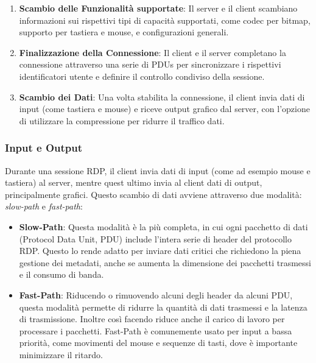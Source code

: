 \documentclass[12pt,a4paper,openright,twoside]{book}
\begin{document}
\begin{enumerate}
    \item \textbf{Scambio delle Funzionalità supportate}: Il server e il client scambiano informazioni sui rispettivi tipi di capacità supportati, come codec per bitmap, supporto per tastiera e mouse, e configurazioni generali.
    \item \textbf{Finalizzazione della Connessione}: Il client e il server completano la connessione attraverso una serie di PDUs per sincronizzare i rispettivi identificatori utente e definire il controllo condiviso della sessione.
    \item \textbf{Scambio dei Dati}: Una volta stabilita la connessione, il client invia dati di input (come tastiera e mouse) e riceve output grafico dal server, con l’opzione di utilizzare la compressione per ridurre il traffico dati.
\end{enumerate}

\subsubsection{Input e Output}
Durante una sessione RDP, il client invia dati di input (come ad esempio mouse e tastiera) al server, mentre quest ultimo invia al client dati di output, principalmente grafici. Questo scambio di dati avviene attraverso due modalità: \textit{slow-path} e \textit{fast-path}:
\begin{itemize}
    \item \textbf{Slow-Path}: Questa modalità è la più completa, in cui ogni pacchetto di dati (Protocol Data Unit, PDU) include l'intera serie di header del protocollo RDP. Questo lo rende adatto per inviare dati critici che richiedono la piena gestione dei metadati, anche se aumenta la dimensione dei pacchetti trasmessi e il consumo di banda.
    \item \textbf{Fast-Path}: Riducendo o rimuovendo alcuni degli header da alcuni PDU, questa modalità permette di ridurre la quantità di dati trasmessi e la latenza di trasmissione. Inoltre così facendo riduce anche il carico di lavoro per processare i pacchetti. Fast-Path è comunemente usato per input a bassa priorità, come movimenti del mouse e sequenze di tasti, dove è importante minimizzare il ritardo.
\end{itemize}
\end{document}
